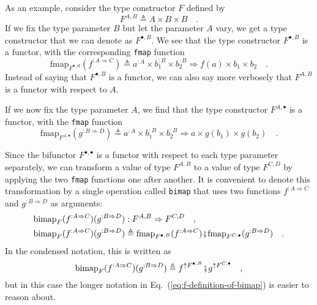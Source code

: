 As an example, consider the type constructor $F$ defined by
\[
F^{A,B}\triangleq A\times B\times B\quad.
\]
If we fix the type parameter $B$ but let the parameter $A$ vary,
we get a type constructor that we can denote as $F^{\bullet,B}$.
We see that the type constructor $F^{\bullet,B}$ is a functor, with
the corresponding \lstinline!fmap! function
\[
\text{fmap}_{F^{\bullet,B}}(f^{:A\Rightarrow C})\triangleq a^{:A}\times b_{1}^{:B}\times b_{2}^{:B}\Rightarrow f(a)\times b_{1}\times b_{2}\quad.
\]
Instead of saying that $F^{\bullet,B}$ is a functor, we can also
say more verbosely that $F^{A,B}$ is a functor with respect to $A$. 

If we now fix the type parameter $A$, we find that the type constructor
$F^{A,\bullet}$ is a functor, with the \lstinline!fmap! function
\[
\text{fmap}_{F^{A,\bullet}}(g^{:B\Rightarrow D})\triangleq a^{:A}\times b_{1}^{:B}\times b_{2}^{:B}\Rightarrow a\times g(b_{1})\times g(b_{2})\quad.
\]

Since the bifunctor $F^{\bullet,\bullet}$ is a functor with respect
to each type parameter separately, we can transform a value of type
$F^{A,B}$ to a value of type $F^{C,D}$ by applying the two \lstinline!fmap!
functions one after another. It is convenient to denote this transformation
by a single operation called \lstinline!bimap! that uses two functions
$f^{:A\Rightarrow C}$ and $g^{:B\Rightarrow D}$ as arguments:
\begin{align}
\text{bimap}_{F}(f^{:A\Rightarrow C})(g^{:B\Rightarrow D}) & :F^{A,B}\Rightarrow F^{C,D}\quad,\nonumber \\
\text{bimap}_{F}(f^{:A\Rightarrow C})(g^{:B\Rightarrow D}) & \triangleq\text{fmap}_{F^{\bullet,B}}(f^{:A\Rightarrow C})\bef\text{fmap}_{F^{C,\bullet}}(g^{:B\Rightarrow D})\quad.\label{eq:f-definition-of-bimap}
\end{align}
In the condensed notation, this is written as
\[
\text{bimap}_{F}(f^{:A\Rightarrow C})(g^{:B\Rightarrow D})\triangleq f^{\uparrow F^{\bullet,B}}\bef g^{\uparrow F^{C,\bullet}}\quad,
\]
but in this case the longer notation in Eq.~(\ref{eq:f-definition-of-bimap})
is easier to reason about. 

